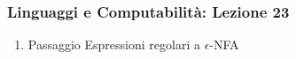 




\begin{frame}[fragile]
	\frametitle{Linguaggi e Computabilità: Lezione 23}
\begin{enumerate}
\item
Passaggio Espressioni regolari a $\epsilon$-NFA
\end{enumerate}
\end{frame}



